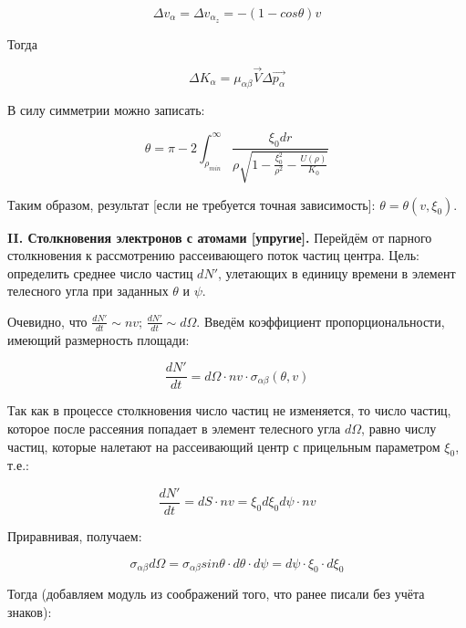 \documentclass[10pt, a4paper]{article}
\numberwithin{equation}{section}
\begin{document}
\begin{equation*}
	\Delta v_\alpha = \Delta v_{\alpha_{z}} = -(1-cos\theta)v
\end{equation*}

Тогда

\begin{equation}
	\label{eq.2.kinetic_energy}
	\Delta K_\alpha = \mu_{\alpha\beta}\vec{V}\Delta\overrightarrow{ p_\alpha} 
\end{equation}

В силу симметрии можно записать:

\begin{equation*}
	\theta = \pi - 2 \int_{\rho_{min}}^{\infty}\frac{\xi_0 dr}{\rho\sqrt{1-\frac{\xi_0^2}{\rho^2}-\frac{U(\rho)}{K_0}}}
\end{equation*}

Таким образом, результат [если не требуется точная зависимость]: $\theta = \theta(v, \xi_0)$.

{\bfseries \large II. Столкновения электронов с атомами [упругие].} Перейдём от парного столкновения к рассмотрению рассеивающего поток частиц центра. Цель: определить среднее число частиц $dN'$, улетающих в единицу времени в элемент телесного угла при заданных $\theta$ и $\psi$.

Очевидно, что $\frac{dN'}{dt} \sim nv;\, \frac{dN'}{dt} \sim d\Omega$. Введём коэффициент пропорциональности, имеющий размерность площади:

\begin{equation*}
	\frac{dN'}{dt} = d\Omega\cdot nv \cdot \sigma_{\alpha\beta}(\theta, v)
\end{equation*}

Так как в процессе столкновения число частиц не изменяется, то число частиц, которое после рассеяния попадает в элемент телесного угла $d\Omega$, равно числу частиц, которые налетают на рассеивающий центр с прицельным параметром $\xi_0$, т.е.:

\begin{equation*}
	\frac{dN'}{dt} = dS \cdot nv = \xi_0 d\xi_0 d\psi   \cdot nv
\end{equation*}

Приравнивая, получаем:

\begin{equation*}
	\sigma_{\alpha\beta} d\Omega = \sigma_{\alpha\beta} sin\theta \cdot d\theta \cdot d\psi = d \psi \cdot \xi_0 \cdot d\xi_0
\end{equation*}

Тогда (добавляем модуль из соображений того, что ранее писали без учёта знаков):
\end{document}
